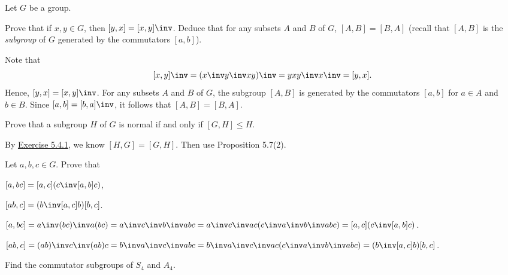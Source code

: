 Let $G$ be a group.

\begin{exercise}\label{ex5.4.1}
    Prove that if $x, y \in G$, then $[y, x] = [x, y]\inv$. Deduce that for any subsets $A$ and $B$ of $G$, $[A, B] = [B, A]$ (recall that $[A, B]$ is the \textit{subgroup} of $G$ generated by the commutators $[a, b]$).
\end{exercise}

\begin{sol}
    Note that
    \[[x, y]\inv = (x\inv y\inv xy)\inv = yx y\inv x\inv = [y, x].\]
    Hence, $[y, x] = [x, y]\inv$. For any subsets $A$ and $B$ of $G$, the subgroup $[A, B]$ is generated by the commutators $[a, b]$ for $a \in A$ and $b \in B$. Since $[a, b] = [b, a]\inv$, it follows that $[A, B] = [B, A]$.
\end{sol}

\begin{exercise}\label{ex5.4.2}
    Prove that a subgroup $H$ of $G$ is normal if and only if $[G, H] \leq H$.
\end{exercise}

\begin{sol}
    By \hyperref[ex5.4.1]{Exercise 5.4.1}, we know $[H, G] = [G, H]$. Then use Proposition 5.7(2).
\end{sol}

\begin{exercise}\label{ex5.4.3}
    Let $a, b, c \in G$. Prove that
    \begin{subproblems}
        \item $[a, bc] = [a, c](c\inv [a, b]c)$,
        \item $[ab, c] = (b\inv[a, c]b)[b, c]$.
    \end{subproblems}
\end{exercise}

\begin{solalph}
    \item $[a, bc] = a\inv (bc)\inv a(bc) = a\inv c\inv b\inv a b c = a\inv c\inv a c (c\inv a\inv b\inv a b c) = [a, c](c\inv [a, b]c)$.
    \item $[ab, c] = (ab)\inv c\inv (ab)c = b\inv a\inv c\inv a b c = b\inv a\inv c\inv a c (c\inv a\inv b\inv a b c) = (b\inv[a, c]b)[b, c]$. \qh
\end{solalph}

\begin{exercise}\label{ex5.4.4}
    Find the commutator subgroups of $S_4$ and $A_4$.
\end{exercise}

